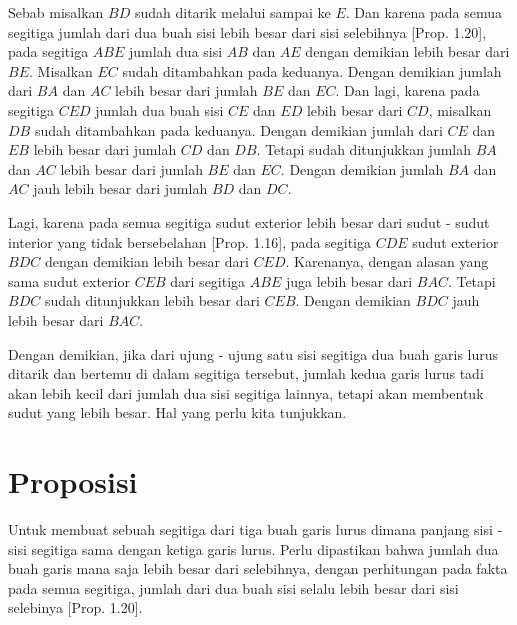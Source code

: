 \documentclass[a4paper]{book}
\begin{document}
Sebab misalkan $BD$ sudah ditarik melalui sampai ke $E$. Dan karena pada semua
segitiga jumlah dari dua buah sisi lebih besar dari sisi selebihnya 
[Prop. 1.20], pada segitiga $ABE$ jumlah dua sisi $AB$ dan $AE$ dengan demikian
lebih besar dari $BE$. Misalkan $EC$ sudah ditambahkan pada keduanya. Dengan 
demikian jumlah dari $BA$ dan $AC$ lebih besar dari jumlah $BE$ dan $EC$. Dan 
lagi, karena pada segitiga $CED$ jumlah dua buah sisi $CE$ dan $ED$ lebih
besar dari $CD$, misalkan $DB$ sudah ditambahkan pada keduanya. Dengan demikian
jumlah dari $CE$ dan $EB$ lebih besar dari jumlah $CD$ dan $DB$. Tetapi
sudah ditunjukkan jumlah $BA$ dan $AC$ lebih besar dari jumlah $BE$ dan $EC$.
Dengan demikian jumlah $BA$ dan $AC$ jauh lebih besar dari jumlah $BD$ 
dan $DC$.

Lagi, karena pada semua segitiga sudut exterior lebih besar dari sudut - sudut
interior yang tidak bersebelahan [Prop. 1.16], pada segitiga $CDE$ sudut exterior
$BDC$ dengan demikian lebih besar dari $CED$. Karenanya, dengan alasan yang
sama sudut exterior $CEB$ dari segitiga $ABE$ juga lebih
besar dari $BAC$. Tetapi $BDC$ sudah ditunjukkan lebih besar dari $CEB$. Dengan
demikian $BDC$ jauh lebih besar dari $BAC$.
 
Dengan demikian, jika dari ujung - ujung satu sisi segitiga dua buah 
garis lurus ditarik dan bertemu di dalam segitiga tersebut, jumlah kedua 
garis lurus tadi akan lebih kecil dari jumlah dua sisi segitiga lainnya, 
tetapi akan membentuk sudut
yang lebih besar. Hal yang perlu kita tunjukkan.


\section*{\centering Proposisi \thesection}
Untuk membuat sebuah segitiga dari tiga buah garis lurus dimana panjang
sisi - sisi segitiga sama dengan ketiga garis lurus. Perlu dipastikan bahwa
jumlah dua buah garis mana saja lebih besar dari selebihnya, dengan 
perhitungan pada fakta pada semua segitiga, jumlah dari dua buah sisi
selalu lebih besar dari sisi selebinya [Prop. 1.20].
\begin{center}
\end{center}
\end{document}

